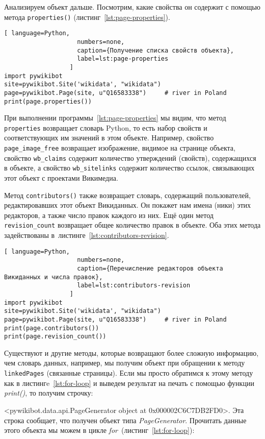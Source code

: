 Анализируем объект дальше. Посмотрим, какие свойства он содержит 
с помощью метода \lstinline|properties()| (листинг~\ref{lst:page-properties}).

\begin{lstlisting}[ language=Python,
                    numbers=none,
                    caption={Получение списка свойств объекта},
                    label=lst:page-properties
                  ]
import pywikibot
site=pywikibot.Site('wikidata', "wikidata")
page=pywikibot.Page(site, u"Q16583338")     # river in Poland
print(page.properties())
\end{lstlisting}

При выполнении программы~\ref{lst:page-properties} мы видим, что метод \lstinline|properties| 
возвращает словарь Python, то есть набор свойств и соответствующих им значений в этом объекте. 
Например, свойство \lstinline|page_image_free| возвращает изображение, видимое на странице объекта, 
свойство \lstinline|wb_claims| содержит количество утверждений (свойств), содержащихся в объекте, 
а свойство \lstinline|wb_sitelinks| содержит количество ссылок, связывающих этот объект с проектами Викимедиа.

Метод \lstinline|contributors()| также возвращает словарь, содержащий пользователей, 
редактировавших этот объект Викиданных. 
Он покажет нам имена (ники) этих редакторов, 
а также число правок каждого из них. 
Ещё один метод \lstinline|revision_count| возвращает общее количество правок в объекте. Оба этих метода задействованы в~листинге~\ref{lst:contributors-revision}.

\begin{lstlisting}[ language=Python,
                    numbers=none,
                    caption={Перечисление редакторов объекта Викиданных и числа правок},
                    label=lst:contributors-revision
                  ]
import pywikibot
site=pywikibot.Site('wikidata', "wikidata")
page=pywikibot.Page(site, u"Q16583338")     # river in Poland
print(page.contributors())
print(page.revision_count())
\end{lstlisting}

Существуют и другие методы, которые возвращают более сложную информацию, 
чем словарь данных, например, мы получим объект при обращении 
к методу \lstinline|linkedPages| (связанные страницы). Если мы просто обратимся к этому методу как в листингe~\ref{lst:for-loop} и выведем результат на печать с помощью функции \textit{print()}, то получим строчку: 

<pywikibot.data.api.PageGenerator object at 0x000002C6C7DB2FD0>.
Эта строка сообщает, что получен объект типа \textit{PageGenerator}. Прочитать данные этого объекта мы можем в цикле \textit{for}~(листинг~\ref{lst:for-loop}):


